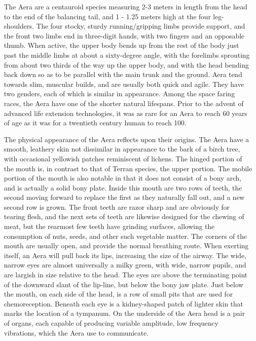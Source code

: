 The Aera are a centauroid species measuring 2-3 meters in length from
the head to the end of the balancing tail, and 1 - 1.25 meters high at
the four leg- shoulders. The four stocky, sturdy running/gripping
limbs provide support, and the front two limbs end in three-digit
hands, with two fingers and an opposable thumb. When active, the upper
body bends up from the rest of the body just past the middle limbs at
about a sixty-degree angle, with the forelimbs sprouting from about
two thirds of the way up the upper body, and with the head bending
back down so as to be parallel with the main trunk and the
ground. Aera tend towards slim, muscular builds, and are usually both
quick and agile. They have two genders, each of which is similar in
appearance. Among the space faring races, the Aera have one of the
shorter natural lifespans. Prior to the advent of advanced life
extension technologies, it was as rare for an Aera to reach 60 years
of age as it was for a twentieth century human to reach 100.

The physical appearance of the Aera reflects upon their origins. The
Aera have a smooth, leathery skin not dissimilar in appearance to the
bark of a birch tree, with occasional yellowish patches reminiscent of
lichens. The hinged portion of the mouth is, in contrast to that of
Terran species, the upper portion. The mobile portion of the mouth is
also notable in that it does not consist of a bony arch, and is
actually a solid bony plate. Inside this mouth are two rows of teeth,
the second moving forward to replace the first as they naturally fall
out, and a new second row is grown. The front teeth are razor sharp
and are obviously for tearing flesh, and the next sets of teeth are
likewise designed for the chewing of meat, but the rearmost few teeth
have grinding surfaces, allowing the consumption of nuts, seeds, and
other such vegetable matter. The corners of the mouth are usually
open, and provide the normal breathing route. When exerting itself, an
Aera will pull back its lips, increasing the size of the airway. The
wide, narrow eyes are almost universally a milky green, with wide,
narrow pupils, and are largish in size relative to the head. The eyes
are above the terminating point of the downward slant of the lip-line,
but below the bony jaw plate. Just below the mouth, on each side of
the head, is a row of small pits that are used for
chemoreception. Beneath each eye is a kidney-shaped patch of lighter
skin that marks the location of a tympanum. On the underside of the
Aera head is a pair of organs, each capable of producing variable
amplitude, low frequency vibrations, which the Aera use to
communicate.

